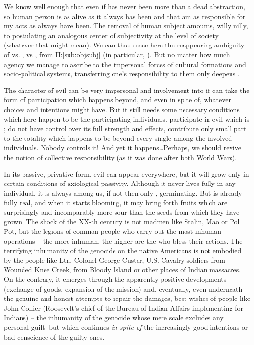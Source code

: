 We know well enough that even if  has never been more than a dead
abstraction, so human person is as alive as it always has
been and that  am as responsible for my acts as  always have been. The
removal of human subject amounts, willy nilly, to postulating an analogous center of
subjectivity at the level of society (whatever that might mean). 
We can thus sense here the reappearing ambiguity of 
vs. ,  vs ,
from II:\ref{sub:objsubj} (in particular, ). But no matter
how much agency we manage to ascribe to the impersonal forces of cultural
formations and socio-political systems, transferring one's responsibility to
them only deepens . 

\pa
The character of evil can be very impersonal and involvement into it can take
the form of participation which happens beyond, and even in spite of, whatever
 choices and intentions  might have. But it still needs
some necessary conditions which here happen to be the participating individuals.
 participate in evil which is ;  do not have
control over its full strength and effects,  contribute only  small
part to the totality which happens to be beyond every single among the involved
individuals. Nobody controls it! And yet it happens\ldots Perhaps, we should revive
the notion of collective responsibility (as it was done after both World Wars).

%
In its passive, privative form, evil can appear everywhere, but it will grow
only in certain conditions of axiological passivity. Although it never lives
fully in any individual, it is always among us, if not  then only
, germinating. But  is already fully real, and
when it starts blooming, it may bring forth fruits which are 
surprisingly and incomparably more sour than the seeds from which they have
grown. The shock of the XX-th century is not madmen like Stalin, Mao or Pol Pot,
but the legions of common people who carry out the most inhuman operations --
the more inhuman, the higher are the  who bless their actions.
The
terrifying inhumanity of the genocide on the native Americans is not embodied by
the people like Ltn. Colonel George Custer, U.S. Cavalry soldiers from Wounded Knee
Creek, from Bloody Island or other places of Indian massacres.  
On the contrary, it emerges through the 
apparently positive developments (exchange of goods, expansion of the mission)
and, eventually, even underneath the genuine and honest attempts to repair the
damages, best wishes of people like John Collier (Roosevelt's chief of the Bureau
of Indian Affairs implementing  for Indians) -- the inhumanity of
the genocide whose mere scale excludes any personal guilt, 
but which continues {\em in spite of} the increasingly good intentions or
bad conscience of the guilty ones.

